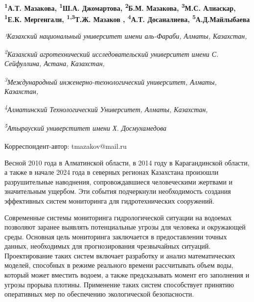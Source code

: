 
\begin{articleheader}

{\bfseries
\textsuperscript{1}А.Т. Мазакова\authorid,
\textsuperscript{1}Ш.А. Джомартова\authorid,
\textsuperscript{2}Б.М. Мазакова\authorid,
\textsuperscript{3}М.С. Алиаскар\authorid,
\textsuperscript{1}Е.К. Мергенгали\authorid,
\textsuperscript{1,3}Т.Ж. Мазаков\textsuperscript{\envelope } \authorid,
\textsuperscript{4}А.Т. Досаналиева\authorid,
\textsuperscript{5}А.Д.Майлыбаева\authorid}
\end{articleheader}

\begin{affiliation}
\emph{¹Казахский национальный университет имени аль-Фараби, Алматы, Казахстан,}

\emph{\textsuperscript{2}Казахский агротехнический исследовательский университет имени С. Сейфуллина, Астана, Казахстан,}

\emph{\textsuperscript{3}Международный инженерно-технологический университет, Алматы, Казахстан,}

\emph{\textsuperscript{4}Алматинский Технологический Университет, Алматы, Казахстан,}

\emph{\textsuperscript{5}Атырауский универститет имени Х. Досмухамедова}

\textsuperscript{\envelope }Корреспондент-автор: tmazakov@mail.ru
\end{affiliation}

Весной 2010 года в Алматинской области, в 2014 году в Карагандинской
области, а также в начале 2024 года в северных регионах Казахстана
произошли разрушительные наводнения, сопровождавшиеся человеческими
жертвами и значительным ущербом. Эти события подчеркнули необходимость
создания эффективных систем мониторинга для гидротехнических сооружений.

Современные системы мониторинга гидрологической ситуации на водоемах
позволяют заранее выявлять потенциальные угрозы для человека и
окружающей среды. Основная цель мониторинга заключается в предоставлении
точных данных, необходимых для прогнозирования чрезвычайных ситуаций.
Проектирование таких систем включает разработку и анализ математических
моделей, способных в режиме реального времени рассчитывать объем воды,
который может вместить водоем, а также предсказывать момент его
заполнения и угрозы прорыва плотины. Применение таких систем
способствует принятию оперативных мер по обеспечению экологической
безопасности.

